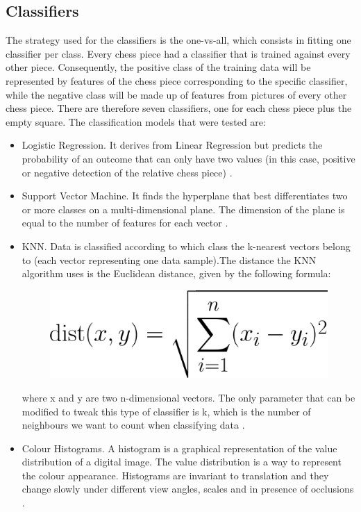 \documentclass{l4proj}
\begin{document}
\subsection{Classifiers} \label{Classifiers}

The strategy used for the classifiers is the one-vs-all, which consists in fitting one classifier per class. Every chess piece had a classifier that is trained against every other piece. Consequently, the positive class of the training data will be represented by features of the chess piece corresponding to the specific classifier, while the negative class will be made up of features from pictures of every other chess piece. There are therefore seven classifiers, one for each chess piece plus the empty square. The classification models that were tested are:

\begin{itemize}

	\item Logistic Regression. It derives from Linear Regression but predicts the probability of an outcome that can only have two values (in this case, positive or negative detection of the relative chess piece) \cite{LRDef}.

	\item Support Vector Machine. It finds the hyperplane that best differentiates two or more classes on a multi-dimensional plane. The dimension of the plane is equal to the number of features for each vector \cite{SVMDef}.

	\item KNN. Data is classified according to which class the k-nearest vectors belong to (each vector representing one data sample).The distance the KNN algorithm uses is the Euclidean distance, given by the following formula:
	
	\begin{figure}[h!]
	\centering
	\includegraphics[scale=0.15]{euclidean_formula.png}
	\label{EuclideanDistance}
	\end{figure}
	\pagebreak
	where x and y are two n-dimensional vectors. The only parameter that can be modified to tweak this type of classifier is k, which is the number of neighbours we want to count when classifying data \cite{KNN}.

	\item Colour Histograms. A histogram is a graphical representation of the value distribution of a digital image. The value distribution is a way to represent the colour appearance. Histograms are invariant to translation and they change slowly under different view angles, scales and in presence of occlusions \cite{ColourHist}.
	
\end{itemize}
\end{document}

